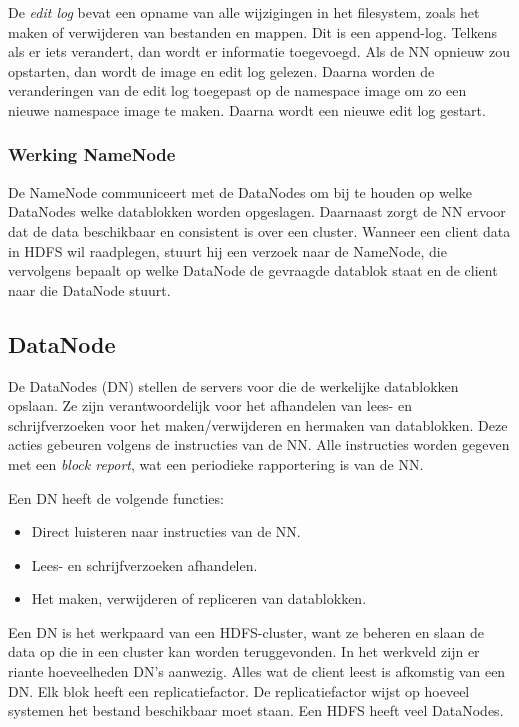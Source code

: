 \documentclass[a4paper,10pt,twoside]{report}
\begin{document}
De \textit{edit log} bevat een opname van alle wijzigingen in het filesystem, zoals het maken of verwijderen van bestanden en mappen. Dit is een append-log. Telkens als er iets verandert, dan wordt er informatie toegevoegd. Als de NN opnieuw zou opstarten, dan wordt de image en edit log gelezen. Daarna worden de veranderingen van de edit log toegepast op de namespace image om zo een nieuwe namespace image te maken. Daarna wordt een nieuwe edit log gestart.

\subsubsection{Werking NameNode}

De NameNode communiceert met de DataNodes om bij te houden op welke DataNodes welke datablokken worden opgeslagen. Daarnaast zorgt de NN ervoor dat de data beschikbaar en consistent is over een cluster. Wanneer een client data in HDFS wil raadplegen, stuurt hij een verzoek naar de NameNode, die vervolgens bepaalt op welke DataNode de gevraagde datablok staat en de client naar die DataNode stuurt.

\subsection{DataNode}

De DataNodes (DN) stellen de servers voor die de werkelijke datablokken opslaan. Ze zijn verantwoordelijk voor het afhandelen van lees- en schrijfverzoeken voor het maken/verwijderen en hermaken van datablokken. Deze acties gebeuren volgens de instructies van de NN. Alle instructies worden gegeven met een \textit{block report}, wat een periodieke rapportering is van de NN.

Een DN heeft de volgende functies:

\begin{itemize}
	\item Direct luisteren naar instructies van de NN.
	\item Lees- en schrijfverzoeken afhandelen.
	\item Het maken, verwijderen of repliceren van datablokken.
\end{itemize}

Een DN is het werkpaard van een HDFS-cluster, want ze beheren en slaan de data op die in een cluster kan worden teruggevonden. In het werkveld zijn er riante hoeveelheden DN's aanwezig. Alles wat de client leest is afkomstig van een DN. Elk blok heeft een replicatiefactor. De replicatiefactor wijst op hoeveel systemen het bestand beschikbaar moet staan. Een HDFS heeft veel DataNodes.
\end{document}
